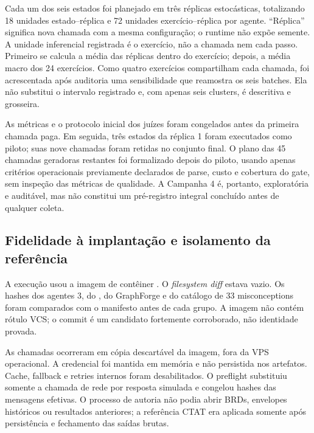 \documentclass[11pt,a4paper]{article}
\begin{document}
Cada um dos seis estados foi planejado em três réplicas estocásticas, totalizando 18 unidades estado--réplica e 72 unidades exercício--réplica por agente. ``Réplica'' significa nova chamada com a mesma configuração; o runtime não expõe semente. A unidade inferencial registrada é o exercício, não a chamada nem cada passo. Primeiro se calcula a média das réplicas dentro do exercício; depois, a média macro dos 24 exercícios. Como quatro exercícios compartilham cada chamada, foi acrescentada após auditoria uma sensibilidade que reamostra os seis batches. Ela não substitui o intervalo registrado e, com apenas seis clusters, é descritiva e grosseira.

As métricas e o protocolo inicial dos juízes foram congelados antes da primeira chamada paga. Em seguida, três estados da réplica 1 foram executados como piloto; suas nove chamadas foram retidas no conjunto final. O plano das 45 chamadas geradoras restantes foi formalizado depois do piloto, usando apenas critérios operacionais previamente declarados de parse, custo e cobertura do gate, sem inspeção das métricas de qualidade. A Campanha 4 é, portanto, exploratória e auditável, mas não constitui um pré-registro integral concluído antes de qualquer coleta.

\subsection{Fidelidade à implantação e isolamento da referência}

A execução usou a imagem de contêiner . O \emph{filesystem diff} estava vazio. Os hashes dos agentes 3, do , do GraphForge e do catálogo de 33 misconceptions foram comparados com o manifesto antes de cada grupo. A imagem não contém rótulo VCS; o commit  é um candidato fortemente corroborado, não identidade provada.

As chamadas ocorreram em cópia descartável da imagem, fora da VPS operacional. A credencial foi mantida em memória e não persistida nos artefatos. Cache, fallback e retries internos foram desabilitados. O preflight substituiu somente a chamada de rede por resposta simulada e congelou hashes das mensagens efetivas. O processo de autoria não podia abrir BRDs, envelopes históricos ou resultados anteriores; a referência CTAT era aplicada somente após persistência e fechamento das saídas brutas.
\end{document}
